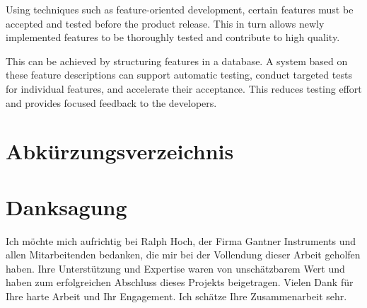 \documentclass[a4paper, fontsize=11pt, parskip=half, twoside]{scrreprt}
\begin{document}
	Using techniques such as feature-oriented development, certain features must be accepted and tested before the product release. 
	This in turn allows newly implemented features to be thoroughly tested and contribute to high quality. 
	
	This can be achieved by structuring features in a database. 
	A system based on these feature descriptions can support automatic testing, conduct targeted tests for individual features, and accelerate their acceptance. 
	This reduces testing effort and provides focused feedback to the developers.
	
	\cleardoublepage   %
	\setcounter{tocdepth}{2}
	\setcounter{secnumdepth}{4}
	\tableofcontents
	
	\clearpage
	\listoffigures
	
	\clearpage
	\section*{Abkürzungsverzeichnis}
	\begin{acronym}
	
	\end{acronym}
	
	\clearpage
	\section*{Danksagung}
	Ich möchte mich aufrichtig bei Ralph Hoch, der Firma Gantner Instruments und allen Mitarbeitenden bedanken, die mir bei der Vollendung dieser Arbeit geholfen haben. 
	Ihre Unterstützung und Expertise waren von unschätzbarem Wert und haben zum erfolgreichen Abschluss dieses Projekts beigetragen. 
	Vielen Dank für Ihre harte Arbeit und Ihr Engagement. 
	Ich schätze Ihre Zusammenarbeit sehr.
	
	
	
\end{document}
